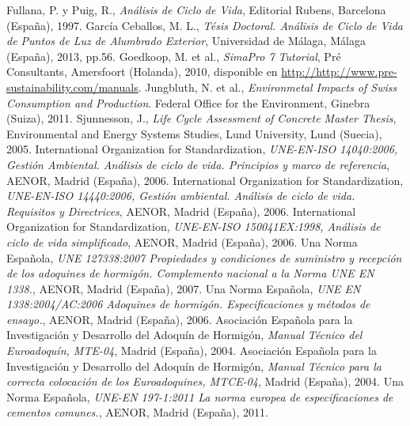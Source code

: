 % 
\begin{thebibliography}{100}
Fullana, P. y Puig, R., \emph{Análisis de Ciclo de Vida}, Editorial Rubens, Barcelona (España), 1997.
García Ceballos, M. L., \emph{Tésis Doctoral. Análisis de Ciclo de Vida de Puntos de Luz de Alumbrado Exterior}, Universidad de Málaga, Málaga (España), 2013, pp.56.
Goedkoop, M. et al., \emph{SimaPro 7 Tutorial}, Pré Consultants, Amersfoort (Holanda), 2010, disponible en \url{http://http://www.pre-sustainability.com/manuals}.
Jungbluth, N. et al., \emph{Environmetal Impacts of Swiss Consumption and Production}. Federal Office for the Environment, Ginebra (Suiza), 2011.
Sjunnesson, J., \emph{Life Cycle Assessment of Concrete Master Thesis}, Environmental and Energy Systems Studies, Lund University, Lund (Suecia), 2005.
International Organization for Standardization, \emph{UNE-EN-ISO 14040:2006, Gestión Ambiental. Análisis de ciclo de vida. Principios y marco de referencia}, AENOR, Madrid (España), 2006.
International Organization for Standardization, \emph{UNE-EN-ISO 14440:2006, Gestión ambiental. Análisis de ciclo de vida. Requisitos y Directrices}, AENOR, Madrid (España), 2006.
International Organization for Standardization, \emph{UNE-EN-ISO 150041EX:1998, Análisis de ciclo de vida simplificado}, AENOR, Madrid (España), 2006.
Una Norma Española, \emph{UNE 127338:2007 Propiedades y condiciones de suministro y recepción de los adoquines de hormigón. Complemento nacional a la Norma UNE EN 1338.}, AENOR, Madrid (España), 2007.
Una Norma Española, \emph{UNE EN 1338:2004/AC:2006 Adoquines de hormigón. Especificaciones y métodos de ensayo.}, AENOR, Madrid (España), 2006.
Asociación Española para la Investigación y Desarrollo del Adoquín de Hormigón, \emph{Manual Técnico del Euroadoquín, MTE-04}, Madrid (España), 2004.
Asociación Española para la Investigación y Desarrollo del Adoquín de Hormigón, \emph{Manual Técnico para la correcta colocación de los Euroadoquines, MTCE-04}, Madrid (España), 2004.
Una Norma Española, \emph{UNE-EN 197-1:2011 La norma europea de especificaciones de cementos comunes.}, AENOR, Madrid (España), 2011.

\end{thebibliography}
